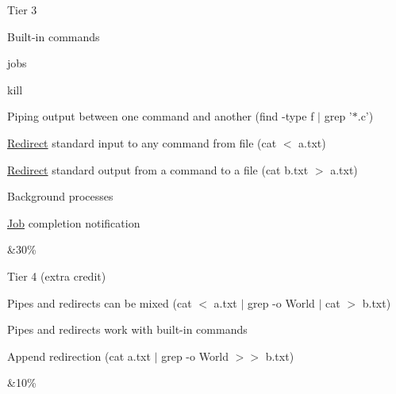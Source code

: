 \begin{TabularC}{2}
\begin{DoxyItemize}
\item Tier 3  
\begin{DoxyItemize}
\item Built-\/in commands  
\begin{DoxyItemize}
\item jobs  
\item kill  
\end{DoxyItemize}
\item Piping output between one command and another (find -\/type f $|$ grep '$\ast$.c')  
\item \hyperlink{structRedirect}{Redirect} standard input to any command from file (cat $<$ a.\-txt)  
\item \hyperlink{structRedirect}{Redirect} standard output from a command to a file (cat b.\-txt $>$ a.\-txt)  
\item Background processes  
\begin{DoxyItemize}
\item \hyperlink{structJob}{Job} completion notification  
\end{DoxyItemize}
\end{DoxyItemize}
\end{DoxyItemize}&30\%   \\

\begin{DoxyItemize}
\item Tier 4 (extra credit)  
\begin{DoxyItemize}
\item Pipes and redirects can be mixed (cat $<$ a.\-txt $|$ grep -\/o World $|$ cat $>$ b.\-txt)  
\item Pipes and redirects work with built-\/in commands  
\item Append redirection (cat a.\-txt $|$ grep -\/o World $>$$>$ b.\-txt)  
\end{DoxyItemize}
\end{DoxyItemize}&10\%   \\


\end{TabularC}
